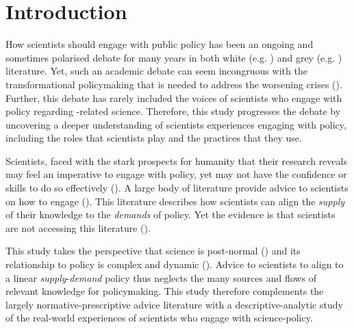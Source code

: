 \chapter{Introduction}\label{ch:intro}

How scientists should engage with public policy has been an ongoing and sometimes polarised debate for many years in both white (e.g. \cite{Nau2009,Stirling2010,Edwards2013,GluckmanBK2021,Gerber2023,GregoryBW2024,Bisbal2024}) and grey (e.g. \cite{Milman2013,Tyler2013,vonSchneidemesserMS2020,Neslen2023,Hicks2024}) literature. Yet, such an academic debate can seem incongruous with the transformational policymaking that is needed to address the worsening \CAN{} crises (\cite{LaybournTS2023,VerfuerthDCWP2023}). Further, this debate has rarely included the voices of scientists who engage with policy regarding \CAN-related science. Therefore, this study progresses the debate by uncovering a deeper understanding of scientists experiences engaging with \CAN{} policy, including the roles that scientists play and the practices that they use.

Scientists, faced with the stark prospects for humanity that their research reveals may feel an imperative to engage with policy, yet may not have the confidence or skills to do so effectively (\cite{BednarekSHG2015,KennyRHTB2017,KEU2021perceptions}). A large body of literature provide advice to scientists on how to engage (\cite{OliverC2019}). This literature describes how scientists can align the \emph{supply} of their knowledge to the \emph{demands} of policy. Yet the evidence is that scientists are not accessing this literature (\cite{CairneyTS2023}). 

This study takes the perspective that \CAN{} science is post-normal (\cite{FuntowiczR1993,Gluckman2014}) and its relationship to \CAN{} policy is complex and dynamic (\cite{StrassheimK2014,BoswellS2017}). Advice to scientists to align to a linear \emph{supply}-\emph{demand} policy thus neglects the many sources and flows of relevant knowledge for \CAN{} policymaking. This study therefore complements the largely normative-prescriptive advice literature with a descriptive-analytic study of the real-world experiences of scientists who engage with \CAN{} science-policy.

